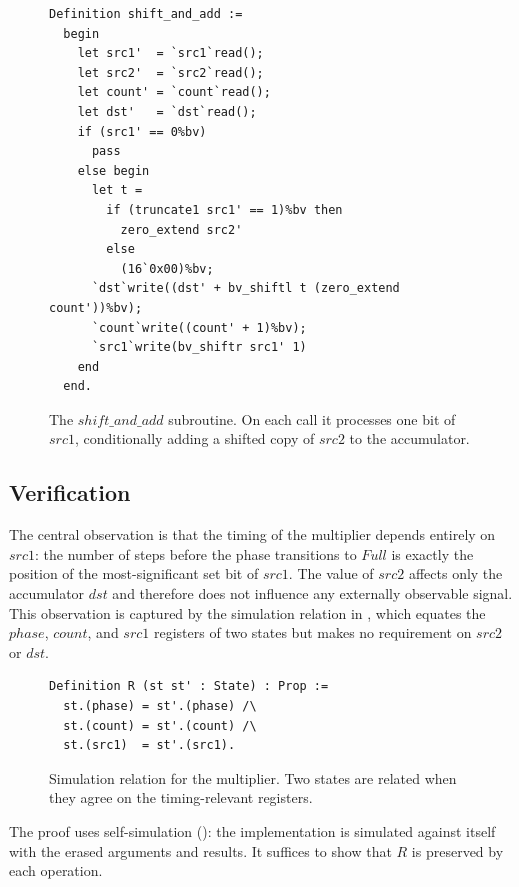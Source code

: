 \documentclass[fontset=fira-newtxsf]{mitthesis}
\theoremstyle{definition}
\theoremstyle{plain}
\begin{document}
\begin{figure}[ht]
\begin{verbatim}
Definition shift_and_add :=
  begin
    let src1'  = `src1`read();
    let src2'  = `src2`read();
    let count' = `count`read();
    let dst'   = `dst`read();
    if (src1' == 0%bv)
      pass
    else begin
      let t =
        if (truncate1 src1' == 1)%bv then
          zero_extend src2'
        else
          (16`0x00)%bv;
      `dst`write((dst' + bv_shiftl t (zero_extend count'))%bv);
      `count`write((count' + 1)%bv);
      `src1`write(bv_shiftr src1' 1)
    end
  end.
\end{verbatim}
\caption[Shift-and-add subroutine]{The $\mathit{shift\_and\_add}$ subroutine. On each call it processes one bit of $\mathit{src1}$, conditionally adding a shifted copy of $\mathit{src2}$ to the accumulator.}
\label{fig:mult-shift-add}
\end{figure}

\subsection{Verification}

The central observation is that the timing of the multiplier depends entirely on $\mathit{src1}$: the number of steps before the phase transitions to $\mathit{Full}$ is exactly the position of the most-significant set bit of $\mathit{src1}$.
The value of $\mathit{src2}$ affects only the accumulator $\mathit{dst}$ and therefore does not influence any externally observable signal.
This observation is captured by the simulation relation in , which equates the $\mathit{phase}$, $\mathit{count}$, and $\mathit{src1}$ registers of two states but makes no requirement on $\mathit{src2}$ or $\mathit{dst}$.

\begin{figure}[ht]
\begin{verbatim}
Definition R (st st' : State) : Prop :=
  st.(phase) = st'.(phase) /\
  st.(count) = st'.(count) /\
  st.(src1)  = st'.(src1).
\end{verbatim}
\caption[Multiplier simulation relation]{Simulation relation for the multiplier. Two states are related when they agree on the timing-relevant registers.}
\label{fig:mult-rel}
\end{figure}

The proof uses self-simulation (): the implementation is simulated against itself with the erased arguments and results.
It suffices to show that $R$ is preserved by each operation.
\end{document}
